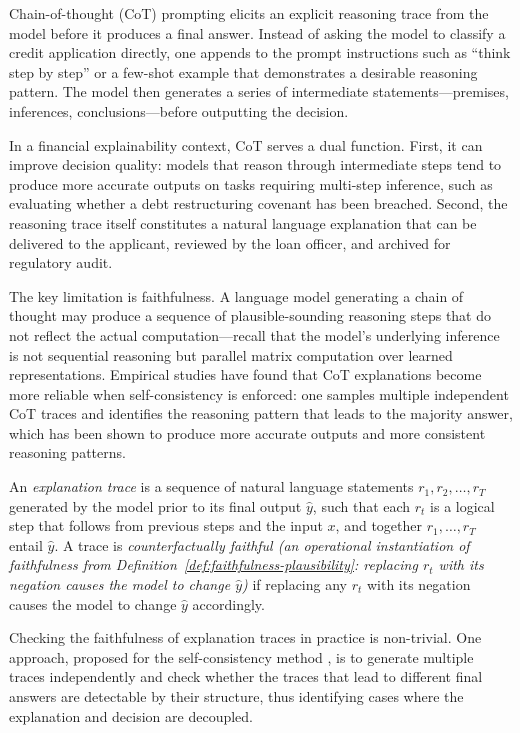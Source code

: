 Chain-of-thought (CoT) prompting \cite{wei2022chain} elicits an explicit reasoning trace
from the model before it produces a final answer. Instead of asking the model to classify
a credit application directly, one appends to the prompt instructions such as ``think
step by step'' or a few-shot example that demonstrates a desirable reasoning pattern. The
model then generates a series of intermediate statements---premises, inferences,
conclusions---before outputting the decision.

In a financial explainability context, CoT serves a dual function. First, it can improve
decision quality: models that reason through intermediate steps tend to produce more
accurate outputs on tasks requiring multi-step inference, such as evaluating whether a
debt restructuring covenant has been breached. Second, the reasoning trace itself
constitutes a natural language explanation that can be delivered to the applicant,
reviewed by the loan officer, and archived for regulatory audit.

The key limitation is faithfulness. A language model generating a chain of thought may
produce a sequence of plausible-sounding reasoning steps that do not reflect the actual
computation---recall that the model's underlying inference is not sequential reasoning
but parallel matrix computation over learned representations. Empirical studies
\cite{wang2022selfconsistency} have found that CoT explanations become more reliable when
self-consistency is enforced: one samples multiple independent CoT traces and identifies
the reasoning pattern that leads to the majority answer, which has been shown to produce
more accurate outputs and more consistent reasoning patterns.

\begin{definition}
\label{def:explanation-trace}
An \emph{explanation trace} is a sequence of natural language statements
$r_1, r_2, \ldots, r_T$ generated by the model prior to its final output $\hat{y}$,
such that each $r_t$ is a logical step that follows from previous steps and the input
$x$, and together $r_1, \ldots, r_T$ entail $\hat{y}$. A trace is \emph{counterfactually faithful (an operational instantiation of faithfulness from Definition~\ref{def:faithfulness-plausibility}: replacing $r_t$ with its negation causes the model to change $\hat{y}$)} if replacing any $r_t$ with its negation causes the model to change $\hat{y}$ accordingly.
\end{definition}

Checking the faithfulness of explanation traces in practice is non-trivial. One approach,
proposed for the self-consistency method \cite{wang2022selfconsistency}, is to generate
multiple traces independently and check whether the traces that lead to different final
answers are detectable by their structure, thus identifying cases where the explanation
and decision are decoupled.


